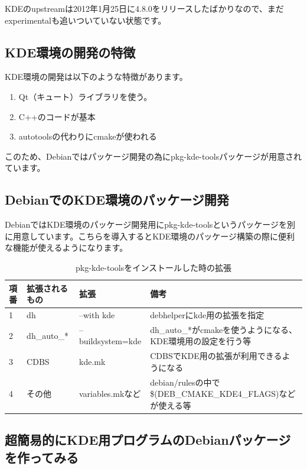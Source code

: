 \documentclass[mingoth,a4paper]{jsarticle}
\begin{document}
KDEのupstreamは2012年1月25日に4.8.0をリリースしたばかりなので、まだ
experimentalも追いついていない状態です。

\subsection{KDE環境の開発の特徴}

KDE環境の開発は以下のような特徴があります。

\begin{enumerate}
\item Qt（キュート）ライブラリを使う。
\item C++のコードが基本
\item autotoolsの代わりにcmakeが使われる
\end{enumerate}

このため、Debianではパッケージ開発の為にpkg-kde-toolsパッケージが用意されています。

\subsection{DebianでのKDE環境のパッケージ開発}

DebianではKDE環境のパッケージ開発用にpkg-kde-toolsというパッケージを別に用意しています。こちらを導入するとKDE環境のパッケージ構築の際に便利な機能が使えるようになります。

\begin{table}[ht]
\begin{center}
\begin{tabular}{|l|l|l|l|}
\hline
項番&拡張されるもの&拡張&備考\\
\hline
1&dh& --with kde & debhelperにkde用の拡張を指定\\
\hline
2&dh\_auto\_*& --buildsystem=kde & dh\_auto\_*がcmakeを使うようになる、KDE環境用の設定を行う等\\
\hline
3&CDBS&kde.mk& CDBSでKDE用の拡張が利用できるようになる\\
\hline
4&その他&variables.mkなど& debian/rulesの中で\$(DEB\_CMAKE\_KDE4\_FLAGS)などが使える等\\
\hline
\end{tabular}
\caption{\label{tab:pkg-kde-tools-inst}pkg-kde-toolsをインストールした時の拡張}
\end{center}
\end{table}

\subsection{超簡易的にKDE用プログラムのDebianパッケージを作ってみる}
\end{document}
